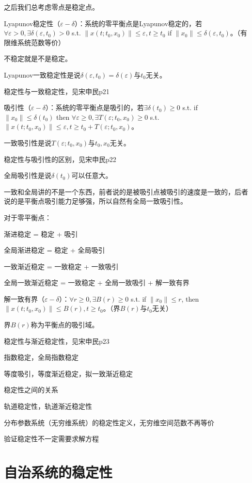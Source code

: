 之后我们总考虑零点是稳定点。

Lyapunov稳定性（$\varepsilon - \delta$）：系统的零平衡点是Lyapunov稳定的，若$\forall \varepsilon > 0, \exists \delta(\varepsilon, t_0) > 0$ s.t. $\|x(t; t_0, x_0)\| \le \varepsilon, t \ge t_0$ if $\|x_0\| \le \delta(\varepsilon, t_0)$。（有限维系统范数等价）

不稳定就是不是稳定。

Lyapunov一致稳定性是说$\delta(\varepsilon, t_0) = \delta(\varepsilon)$与$t_0$无关。

稳定性与一致稳定性，见宋申民p21

吸引性（$\varepsilon - \delta$）：系统的零平衡点是吸引的，若$\exists \delta(t_0) \ge 0$ s.t. if $\|x_0\| \le \delta(t_0)$ then $\forall \varepsilon \ge 0, \exists T(\varepsilon; t_0, x_0) \ge 0$ s.t. $\|x(t; t_0, x_0)\| \le \varepsilon, t \ge t_0 + T(\varepsilon; t_0, x_0)$。

一致吸引性是说$T(\varepsilon; t_0, x_0)$与$t_0, x_0$无关。

稳定性与吸引性的区别，见宋申民p22

全局吸引性是说$\delta(t_0)$可以任意大。

一致和全局讲的不是一个东西，前者说的是被吸引点被吸引的速度是一致的，后者说的是平衡点吸引能力足够强，所以自然有全局一致吸引性。

对于零平衡点：

渐进稳定 = 稳定 + 吸引

全局渐进稳定 = 稳定 + 全局吸引

一致渐近稳定 = 一致稳定 + 一致吸引

全局一致渐近稳定 = 一致稳定 + 全局一致吸引 + 解一致有界

解一致有界（$\varepsilon - \delta$）：$\forall r \ge 0, \exists B(r) \ge 0$ s.t. if $\|x_0\| \le r$, then $\|x(t; t_0, x_0)\| \le B(r), t \ge t_0$。（界$B(r)$与$t_0$无关）

界$B(r)$称为平衡点的吸引域。

稳定性与渐近稳定性，见宋申民p23

指数稳定，全局指数稳定

等度吸引，等度渐近稳定，拟一致渐近稳定

稳定性之间的关系

轨道稳定性，轨道渐近稳定性

分布参数系统（无穷维系统）的稳定性定义，无穷维空间范数不再等价

验证稳定性不一定需要求解方程

\section{自治系统的稳定性}

